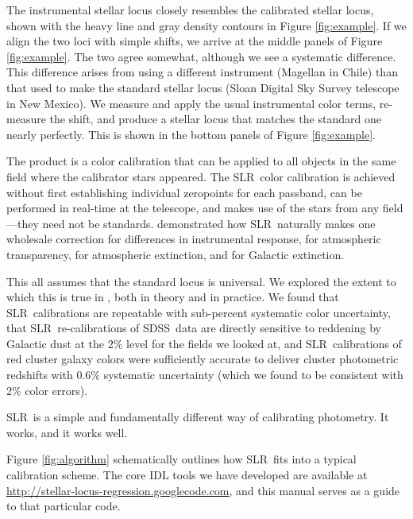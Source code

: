 \documentclass{report}
\newcommand{\sdss}{SDSS}
\newcommand{\slr}{SLR}
\begin{document}
The instrumental stellar locus closely resembles the calibrated
stellar locus, shown with the heavy line and gray density contours in
Figure \ref{fig:example}.  If we align the two loci with simple
shifts, we arrive at the middle panels of Figure \ref{fig:example}.
The two agree somewhat, although we see a systematic difference.  This
difference arises from using a different instrument (Magellan in
Chile) than that used to make the standard stellar locus (Sloan
Digital Sky Survey telescope in New Mexico).  We measure and apply the
usual instrumental color terms, re-measure the shift, and produce a
stellar locus that matches the standard one nearly perfectly.  This is
shown in the bottom panels of Figure \ref{fig:example}.

The product is a color calibration that can be applied to all objects
in the same field where the calibrator stars appeared.  The \slr\
color calibration is achieved without first establishing individual
zeropoints for each passband, can be performed in real-time at the
telescope, and makes use of the stars from any field---they need not
be standards.  \citet{bib:slr} demonstrated how \slr\ naturally makes
one wholesale correction for differences in instrumental response, for
atmospheric transparency, for atmospheric extinction, and for Galactic
extinction.  

This all assumes that the standard locus is universal.  We explored
the extent to which this is true in \citet{bib:slr}, both in theory
and in practice.  We found that \slr\ calibrations are repeatable with
sub-percent systematic color uncertainty, that \slr\ re-calibrations
of \sdss\ data are directly sensitive to reddening by Galactic dust at
the 2\% level for the fields we looked at, and \slr\ calibrations of
red cluster galaxy colors were sufficiently accurate to deliver
cluster photometric redshifts with 0.6\% systematic uncertainty (which
we found to be consistent with 2\% color errors).

\slr\ is a simple and fundamentally different way of calibrating
photometry.  It works, and it works well.

Figure \ref{fig:algorithm} schematically outlines how \slr\ fits into
a typical calibration scheme.  The core IDL tools we have developed
are available at \url{http://stellar-locus-regression.googlecode.com},
and this manual serves as a guide to that particular code.
\end{document}
